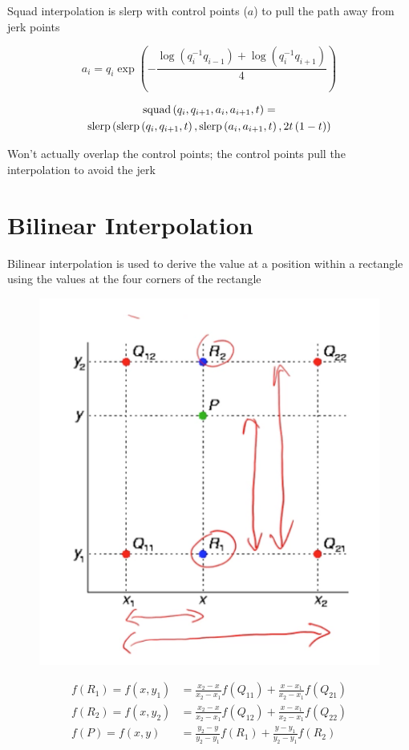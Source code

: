   Squad interpolation is slerp with control points ($ a $) to pull the path
  away from jerk points

  \begin{equation}
    a_{i} =
      q_{i} \exp
      \left(
        - \frac{\log\left( q_{i}^{-1} q_{i - 1} \right)
        + \log\left( q_{i}^{-1} q_{i + 1} \right)}{4}
      \right)
  \end{equation}

  \begin{multline}
    \operatorname{squad}\left( q_{i}, q_{i + 1}, a_{i}, a_{i + 1}, t \right) = \\
      \operatorname{slerp}\left(
        \operatorname{slerp}\left( q_{i}, q_{i + 1}, t \right),
        \operatorname{slerp}\left( a_{i}, a_{i + 1}, t \right),
        2t \left( 1 - t \right)
      \right)
  \end{multline}

  Won’t actually overlap the control points; the control points pull the
  interpolation to avoid the jerk


\section{Bilinear Interpolation}

  Bilinear interpolation is used to derive the value at a position within
  a rectangle using the values at the four corners of the rectangle

  \begin{figure}[H]
    \centering
    \includegraphics[width=0.5\columnwidth]{images/interpolation/bilinear.png}
  \end{figure}

  \begin{align}
    f\left( R_{1} \right) = f\left( x, y_{1} \right) &=
      \frac{x_{2} - x}{x_{2} - x_{1}} f\left( Q_{11} \right) + \frac{x - x_{1}}{x_{2} - x_{1}} f\left( Q_{21} \right) \\
    f\left( R_{2} \right) = f\left( x, y_{2} \right) &=
      \frac{x_{2} - x}{x_{2} - x_{1}} f\left( Q_{12} \right) + \frac{x - x_{1}}{x_{2} - x_{1}} f\left( Q_{22} \right) \\
    f\left( P \right) = f\left( x, y \right) &=
      \frac{y_{2} - y}{y_{2} - y_{1}} f\left( R_{1} \right) + \frac{y - y_{1}}{y_{2} - y_{1}} f\left( R_{2} \right) \\
  \end{align}

